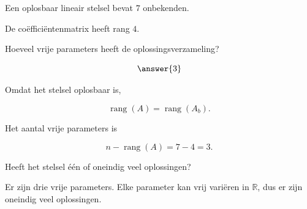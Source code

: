 \documentclass{ximera}
\begin{document}

\begin{oefening}{\oefU\ESS}

Een oplosbaar lineair stelsel bevat \(7\) onbekenden.

De coëfficiëntenmatrix heeft rang \(4\).

\begin{question}

Hoeveel vrije parameters heeft de oplossingsverzameling?

\[
\answer{3}
\]

\begin{oplossing}

Omdat het stelsel oplosbaar is,

\[
\operatorname{rang}(A)
=
\operatorname{rang}(A_b).
\]

Het aantal vrije parameters is

\[
n-\operatorname{rang}(A)
=
7-4
=
3.
\]

\end{oplossing}

\end{question}


\begin{question}

Heeft het stelsel één of oneindig veel oplossingen?

\begin{multipleChoice}
\end{multipleChoice}

\begin{oplossing}

Er zijn drie vrije parameters. Elke parameter kan vrij variëren in
\(\mathbb{R}\), dus er zijn oneindig veel oplossingen.

\end{oplossing}

\end{question}

\end{oefening}



\end{document}

